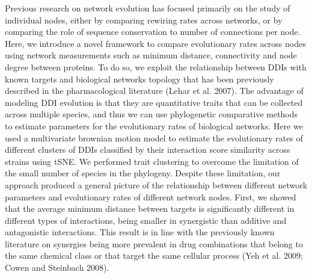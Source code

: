 \documentclass[
]{article}
\begin{document}
Previous research on network evolution has focused primarily on the study of individual nodes, either by comparing rewiring rates across networks, or by comparing the role of sequence conservation to number of connections per node. Here, we introduce a novel framework to compare evolutionary rates across nodes using network measurements such as minimum distance, connectivity and node degree between proteins. To do so, we exploit the relationship between DDIs with known targets and biological networks topology that has been previously described in the pharmacological literature (Lehar et al. 2007). The advantage of modeling DDI evolution is that they are quantitative traits that can be collected across multiple species, and thus we can use phylogenetic comparative methods to estimate parameters for the evolutionary rates of biological networks. Here we used a multivariate brownian motion model to estimate the evolutionary rates of different clusters of DDIs classified by their interaction score similarity across strains using tSNE. We performed trait clustering to overcome the limitation of the small number of species in the phylogeny.
Despite these limitation, our approach produced a general picture of the relationship between different network parameters and evolutionary rates of different network nodes. First, we showed that the average minimum distance between targets is significantly different in different types of interactions, being smaller in synergistic than additive and antagonistic interactions. This result is in line with the previously known literature on synergies being more prevalent in drug combinations that belong to the same chemical class or that target the same cellular process (Yeh et al. 2009; Cowen and Steinbach 2008).
\end{document}
